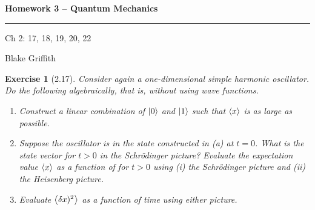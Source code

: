 
\usepackage{amsfonts, amsmath, amsthm}

\setlength{\parskip}{1ex}
\setlength{\parindent}{0pt}

\newtheorem*{exer}{Exercise}

\newcommand{\lam}{\lambda}



\textbf{Homework 3 -- Quantum Mechanics} \\

\hrule

\begin{minipage}{.80\linewidth}
    \flushleft
    Ch 2: 17, 18, 19, 20, 22 \\
\end{minipage}
\begin{minipage}{.20\linewidth}
    \flushright
    Blake Griffith
\end{minipage}


\begin{exer}[2.17]

    Consider again a one-dimensional simple harmonic oscillator. Do the
    following algebraically, that is, without using wave functions.

    \begin{enumerate}
        \item Construct a linear combination of $\left| 0 \right>$ and $\left| 1 \right>$
            such that $\left< x \right>$ is as large as possible.

        \item Suppose the oscillator is in the state constructed in (a)
            at $t=0$. What is the state vector for $t>0$ in the
            Schr\"{o}dinger picture? Evaluate the expectation value
            $\left< x \right>$ as a function of for $t>0$ using (i) the
            Schr\"{o}dinger picture and (ii) the Heisenberg picture.

        \item Evaluate $\left< \delta x)^2 \right>$ as a function of time using
            either picture.

    \end{enumerate}

\end{exer}

